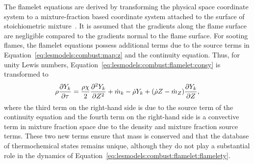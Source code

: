 The flamelet equations are derived by transforming the physical space coordinate system to a mixture-fraction based coordinate system attached to the surface of stoichiometric mixture~\cite{peters1984}. It is assumed that the gradients along the flame surface are negligible compared to the gradients normal to the flame surface. For sooting flames, the flamelet equations possess additional terms due to the source terms in Equation~\ref{eq:lesmodels:combust:map:z} and the continuity equation. Thus, for unity Lewis numbers, Equation~\ref{eq:lesmodels:combust:flamelet:consy} is transformed to
\begin{equation}\label{eq:lesmodels:combust:flamelet:flamelety}
  \rho\pder[Y_k]{\tau} = \frac{\rho\chi}{2}\sder[Y_k]{Z} + \dot{m}_k - \dot{\rho}Y_k + (\dot{\rho}Z - \dot{m}_Z)\pder[Y_k]{Z},
\end{equation}
where the third term on the right-hand side is due to the source term of the continuity equation and the fourth term on the right-hand side is a convective term in mixture fraction space due to the density and mixture fraction source terms. These two new terms ensure that mass is conserved and that the database of thermochemical states remains unique, although they do not play a substantial role in the dynamics of Equation~\ref{eq:lesmodels:combust:flamelet:flamelety}.

